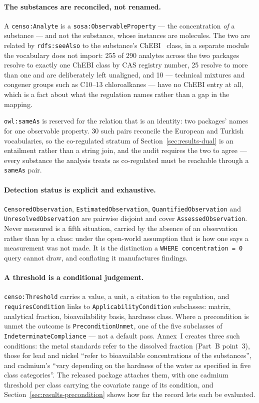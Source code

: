 \paragraph{The substances are reconciled, not renamed.}
A \texttt{censo:Analyte} is a \texttt{sosa:ObservableProperty} --- the
concentration \emph{of} a substance --- and not the substance, whose instances
are molecules. The two are related by \texttt{rdfs:seeAlso} to the substance's
ChEBI~\cite{degtyarenko2008chebi} class, in a separate module the vocabulary does not
import: \num{255} of \num{290} analytes
across the two packages resolve to exactly one ChEBI class by CAS registry
number, \num{25} resolve to more than one and are deliberately left unaligned,
and \num{10} --- technical mixtures and congener groups such as C10--13
chloroalkanes --- have no ChEBI entry at all, which is a fact about what the
regulation names rather than a gap in the mapping.

\texttt{owl:sameAs} is reserved for the relation that is an identity: two
packages' names for one observable property. \num{30} such pairs reconcile the
European and Turkish vocabularies, so the co-regulated stratum of
Section~\ref{sec:results-dual} is an entailment rather than a string join, and
the audit requires the two to agree --- every substance the analysis treats as
co-regulated must be reachable through a \texttt{sameAs} pair.

\paragraph{Detection status is explicit and exhaustive.}
\texttt{CensoredObservation}, \texttt{EstimatedObservation},
\texttt{QuantifiedObservation} and \texttt{UnresolvedObservation} are pairwise
disjoint and cover \texttt{AssessedObservation}. Never measured is a fifth
situation, carried by the absence of an observation rather than by a class:
under the open-world assumption that is how one says a measurement was not made.
It is the distinction a \texttt{WHERE concentration = 0} query cannot draw, and
conflating it manufactures findings.

\paragraph{A threshold is a conditional judgement.}
\texttt{censo:Threshold} carries a value, a unit, a citation to the regulation,
and \texttt{requiresCondition} links to \texttt{ApplicabilityCondition}
subclasses: matrix, analytical fraction, bioavailability basis, hardness class.
Where a precondition is unmet the outcome is \texttt{PreconditionUnmet}, one
of the five subclasses of \texttt{IndeterminateCompliance} --- not a default
pass. Annex~I creates three such conditions: the metal standards refer to the
dissolved fraction (Part~B point~3), those for lead and nickel ``refer to
bioavailable concentrations of the substances'', and cadmium's ``vary depending
on the hardness of the water as specified in five class categories''. The
released package attaches them, with one cadmium threshold per class carrying the
covariate range of its condition, and Section~\ref{sec:results-precondition}
shows how far the record lets each be evaluated.

